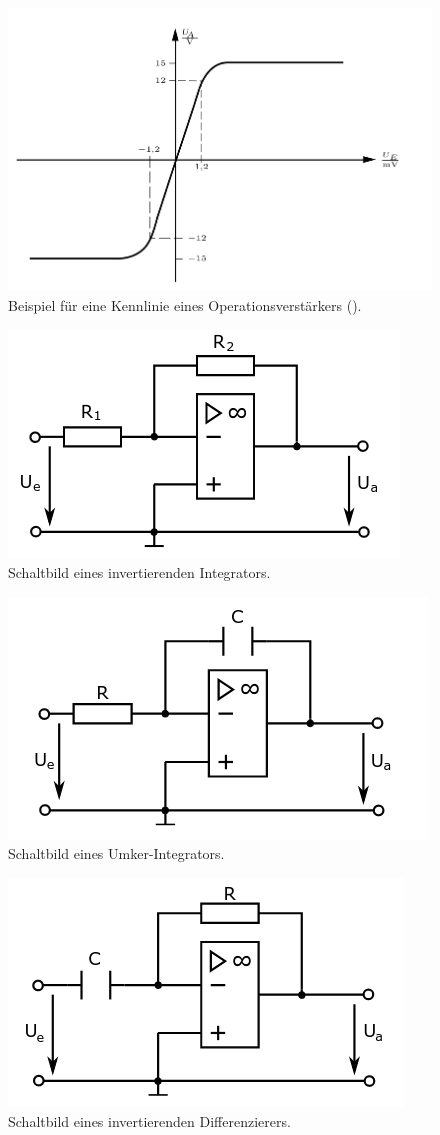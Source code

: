 \begin{figure}
    \centering 
    \includegraphics[width=.8\textwidth]{Bilder/Kennlinie.PNG}
    \caption{Beispiel für eine Kennlinie eines Operationsverstärkers (\cite[S.~99]{Clausert}).}
    \label{fig:Kennlinie}
\end{figure}





\begin{figure}
    \centering 
    \includegraphics[width=.5\textwidth]{Bilder/Inv_Lin.png}
    \caption{Schaltbild eines invertierenden Integrators.}
    \label{fig:Inv_Lin}
\end{figure}



\begin{figure}
    \centering 
    \includegraphics[width=.5\textwidth]{Bilder/Um_Int.png}
    \caption{Schaltbild eines Umker-Integrators.}
    \label{fig:Um_Int}
\end{figure}

\begin{figure}
    \centering 
    \includegraphics[width=.5\textwidth]{Bilder/Inv_Dif.png}
    \caption{Schaltbild eines invertierenden Differenzierers.}
    \label{fig:Inv_Dif}
\end{figure}

